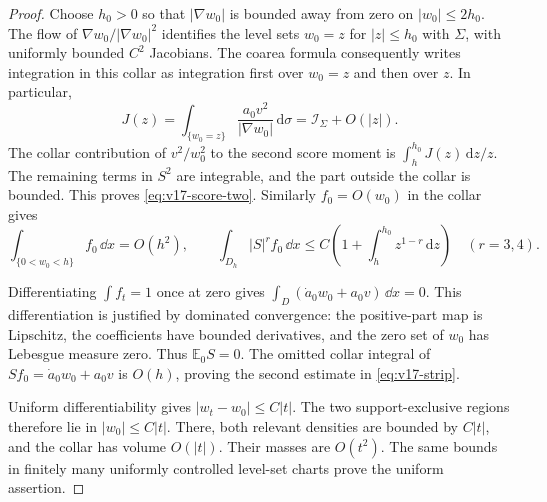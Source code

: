 \begin{proof}
Choose $h_0>0$ so that $|\nabla w_0|$ is bounded away from zero on
$|w_0|\le2h_0$. The flow of
$\nabla w_0/|\nabla w_0|^2$ identifies the level sets $w_0=z$ for
$|z|\le h_0$ with $\Sigma$, with uniformly bounded $C^2$ Jacobians.
The coarea formula consequently writes integration in this collar as
integration first over $w_0=z$ and then over $z$. In particular,
\[
 J(z)=\int_{\{w_0=z\}}
              \frac{a_0v^2}{|\nabla w_0|}\,\mathrm d\sigma
           =\mathcal I_\Sigma+O(|z|).
\]
The collar contribution of $v^2/w_0^2$ to the second score moment is
$\int_h^{h_0}J(z)\,\mathrm dz/z$. The remaining terms in $S^2$
are integrable, and the part outside the collar is bounded. This proves
\eqref{eq:v17-score-two}. Similarly $f_0=O(w_0)$ in the collar gives
\[
 \int_{\{0<w_0<h\}} f_0\,\dd x=O(h^2),\qquad
 \int_{D_h}|S|^r f_0\,\dd x
       \le C\left(1+\int_h^{h_0}z^{1-r}\,\mathrm dz\right)
                                                     \quad(r=3,4).
\]

Differentiating $\int f_t=1$ once at zero gives
$\int_D(\dot a_0w_0+a_0v)\,\dd x=0$. This differentiation is
justified by dominated convergence: the positive-part map is Lipschitz,
the coefficients have bounded derivatives, and the zero set of $w_0$
has Lebesgue measure zero. Thus $\mathbb E_0 S=0$. The omitted collar
integral of $Sf_0=\dot a_0w_0+a_0v$ is $O(h)$, proving the second
estimate in \eqref{eq:v17-strip}.

Uniform differentiability gives $|w_t-w_0|\le C|t|$. The two
support-exclusive regions therefore lie in $|w_0|\le C|t|$.
There, both relevant densities are bounded by $C|t|$, and the
collar has volume $O(|t|)$. Their masses are $O(t^2)$. The same
bounds in finitely many uniformly controlled level-set charts prove
the uniform assertion.
\end{proof}

